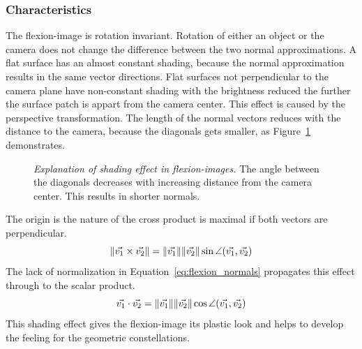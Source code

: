 \subsubsection*{Characteristics}

The \gls{flexion-image} is rotation invariant.
Rotation of either an object or the camera does not change the difference between the two normal approximations.
A flat surface has an almost constant shading, because the normal approximation results in the same vector directions.
Flat surfaces not perpendicular to the camera plane have non-constant shading with the brightness reduced the further the surface patch is appart from the camera center.
This effect is caused by the perspective transformation.
The length of the normal vectors reduces with the distance to the camera, because the diagonals gets smaller, as Figure~\ref{fig:flexion_angle_decrease} demonstrates.
\begin{figure}[H]
    
    \caption[Explanation of shading effect in \glspl{flexion-image}]{\emph{Explanation of shading effect in \glspl{flexion-image}.} The angle between the diagonals decreases with increasing distance from the camera center. This results in shorter normals.}\label{fig:flexion_angle_decrease}
\end{figure}
The origin is the nature of the cross product is maximal if both vectors are perpendicular.
\begin{equation*}
    \lVert\vec{v_1} \times \vec{v_2}\rVert = \lVert\vec{v_1}\rVert \lVert\vec{v_2}\rVert \sin \angle(\vec{v_1}, \vec{v_2})
\end{equation*}
The lack of normalization in Equation~\ref{eq:flexion_normals} propagates this effect through to the scalar product.
\begin{equation*}
    \vec{v_1} \cdot \vec{v_2} = \lVert\vec{v_1}\rVert \lVert\vec{v_2}\rVert \cos \angle(\vec{v_1}, \vec{v_2})
\end{equation*}
This shading effect gives the \gls{flexion-image} its plastic look and helps to develop the feeling for the geometric constellations.
